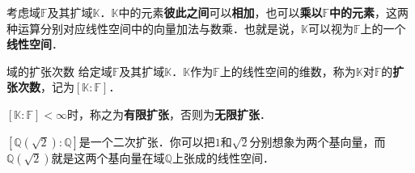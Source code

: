 考虑域$\mathbb{F}$及其扩域$\mathbb{K}$．$\mathbb{K}$中的元素\textbf{彼此之间}可以\textbf{相加}，也可以\textbf{乘以}$\mathbb{F}$\textbf{中的元素}，这两种运算分别对应线性空间中的向量加法与数乘．也就是说，$\mathbb{K}$可以视为$\mathbb{F}$上的一个\textbf{线性空间}．

\begin{definition}{域的扩张次数}
给定域$\mathbb{F}$及其扩域$\mathbb{K}$．$\mathbb{K}$作为$\mathbb{F}$上的线性空间的维数，称为$\mathbb{K}$对$\mathbb{F}$的\textbf{扩张次数}，记为$[\mathbb{K}:\mathbb{F}]$．

$[\mathbb{K}:\mathbb{F}]<\infty$时，称之为\textbf{有限扩张}，否则为\textbf{无限扩张}．
\end{definition}

$[\mathbb{Q}(\sqrt{2}):\mathbb{Q}]$是一个二次扩张．你可以把$1$和$\sqrt{2}$分别想象为两个基向量，而$\mathbb{Q}(\sqrt{2})$就是这两个基向量在域$\mathbb{Q}$上张成的线性空间．







